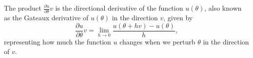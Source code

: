 The product $\frac{\partial u}{\partial \theta}v$ is the directional derivative of the function $u(\theta)$, also known as the Gateaux derivative of $u(\theta)$ in the direction $v$, given by 
\begin{equation}
    \frac{\partial u}{\partial \theta} v 
    = 
    \lim_{h \rightarrow 0} \frac{u(\theta + h v) - u(\theta)}{h},
    \label{eq:directional-derivative}
\end{equation}
representing how much the function $u$ changes when we perturb $\theta$ in the direction of $v$. 



